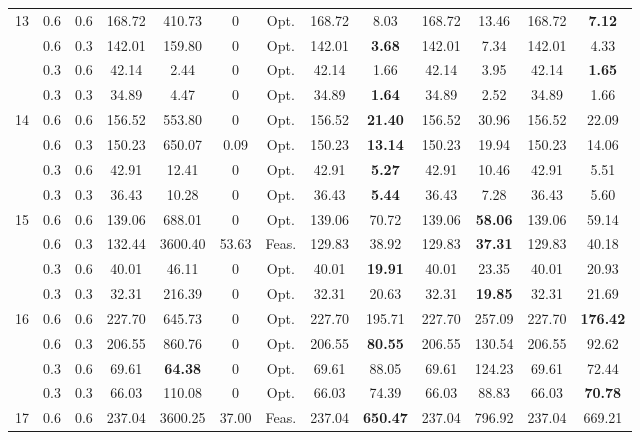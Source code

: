 \documentclass[letterpaper, 10 pt, conference]{ieeeconf}  %
\begin{document}
\begin{table}[htb]
{\begin{tabular}{@{} ccc ccc ccc cc cc @{}}
    \midrule
    \multirow{4}{*}{13} 
    & 0.6 & 0.6 & 168.72 & 410.73 & 0 & Opt. & 168.72 & 8.03 & 168.72 & 13.46 & 168.72 & \textbf{7.12} \\
    & 0.6 & 0.3 & 142.01 & 159.80 & 0 & Opt. & 142.01 & \textbf{3.68} & 142.01 & 7.34 & 142.01 & 4.33 \\
    & 0.3 & 0.6 & 42.14 & 2.44 & 0 & Opt. & 42.14 & 1.66 & 42.14 & 3.95 & 42.14 & \textbf{1.65} \\
    & 0.3 & 0.3 & 34.89 & 4.47 & 0 & Opt. & 34.89 & \textbf{1.64} & 34.89 & 2.52 & 34.89 & 1.66 \\
    \midrule
    \multirow{4}{*}{14} 
    & 0.6 & 0.6 & 156.52 & 553.80 & 0 & Opt. & 156.52 & \textbf{21.40} & 156.52 & 30.96 & 156.52 & 22.09 \\
    & 0.6 & 0.3 & 150.23 & 650.07 & 0.09 & Opt. & 150.23 & \textbf{13.14} & 150.23 & 19.94 & 150.23 & 14.06 \\
    & 0.3 & 0.6 & 42.91 & 12.41 & 0 & Opt. & 42.91 & \textbf{5.27} & 42.91 & 10.46 & 42.91 & 5.51 \\
    & 0.3 & 0.3 & 36.43 & 10.28 & 0 & Opt. & 36.43 & \textbf{5.44} & 36.43 & 7.28 & 36.43 & 5.60 \\
    \midrule
    \multirow{4}{*}{15} 
    & 0.6 & 0.6 & 139.06 & 688.01 & 0 & Opt. & 139.06 & 70.72 & 139.06 & \textbf{58.06} & 139.06 & 59.14 \\
    & 0.6 & 0.3 & 132.44 & 3600.40 & 53.63 & Feas. & 129.83 & 38.92 & 129.83 & \textbf{37.31} & 129.83 & 40.18 \\
    & 0.3 & 0.6 & 40.01 & 46.11 & 0 & Opt. & 40.01 & \textbf{19.91} & 40.01 & 23.35 & 40.01 & 20.93 \\
    & 0.3 & 0.3 & 32.31 & 216.39 & 0 & Opt. & 32.31 & 20.63 & 32.31 & \textbf{19.85} & 32.31 & 21.69 \\
    \midrule
    \multirow{4}{*}{16} 
    & 0.6 & 0.6 & 227.70 & 645.73 & 0 & Opt. & 227.70 & 195.71 & 227.70 & 257.09 & 227.70 & \textbf{176.42} \\
    & 0.6 & 0.3 & 206.55 & 860.76 & 0 & Opt. & 206.55 & \textbf{80.55} & 206.55 & 130.54 & 206.55 & 92.62 \\
    & 0.3 & 0.6 & 69.61 & \textbf{64.38} & 0 & Opt. & 69.61 & 88.05 & 69.61 & 124.23 & 69.61 & 72.44 \\
    & 0.3 & 0.3 & 66.03 & 110.08 & 0 & Opt. & 66.03 & 74.39 & 66.03 & 88.83 & 66.03 & \textbf{70.78} \\
    \midrule
    \multirow{4}{*}{17} 
    & 0.6 & 0.6 & 237.04 & 3600.25 & 37.00 & Feas. & 237.04 & \textbf{650.47} & 237.04 & 796.92 & 237.04 & 669.21 \\

\end{tabular}}
\end{table}
\end{document}

